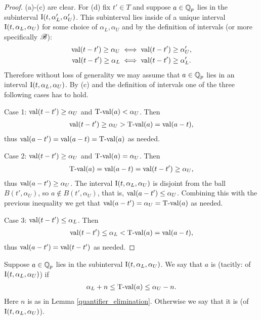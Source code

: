 \documentclass{amsart}
\begin{document}
\begin{proof}
  (a)-(c) are clear.
  For (d) fix $t' \in T$ and suppose $a \in \mathbb{Q}_p$ lies in the subinterval $\operatorname{I}(t, \alpha_L', \alpha_U')$.
  This  subinterval lies inside of a unique interval $\operatorname{I}(t, \alpha_L, \alpha_U)$ for some choice of $\alpha_L, \alpha_U$ and
  by the definition of intervals (or more specifically $\mathscr B$):
  \begin{align*}
    \operatorname{val}(t - t') \geq \alpha_U &\iff \operatorname{val}(t - t') \geq \alpha_U',\\
    \operatorname{val}(t - t') \geq \alpha_L &\iff \operatorname{val}(t - t') \geq \alpha_L'.
  \end{align*}
  Therefore without loss of generality we may assume that $a \in \mathbb{Q}_p$ lies in an interval $\operatorname{I}(t, \alpha_L, \alpha_U)$.
  By (c) and the definition of intervals one of the three following cases has to hold.
  
  Case 1: $\operatorname{val}(t - t') \geq \alpha_U$ and $\operatorname{T-val}(a) < \alpha_U$. Then
  \begin{align*}
    \operatorname{val}(t - t') \geq \alpha_U > \operatorname{T-val}(a) = \operatorname{val}(a - t),
  \end{align*}
  thus $\operatorname{val}(a - t') = \operatorname{val}(a - t) = \operatorname{T-val}(a)$ as needed.

  Case 2: $\operatorname{val}(t - t') \geq \alpha_U$ and $\operatorname{T-val}(a) = \alpha_U$. Then
  \begin{align*}
    \operatorname{T-val}(a) = \operatorname{val}(a - t) = \operatorname{val}(t - t') \geq \alpha_U,
  \end{align*}
  thus $\operatorname{val}(a - t') \geq \alpha_U$.
  The interval $\operatorname{I}(t, \alpha_L, \alpha_U)$ is disjoint from the ball $B(t', \alpha_U)$,
  so $a \notin B(t', \alpha_U)$, that is, $\operatorname{val}(a - t') \leq \alpha_U$.
  Combining this with the previous inequality we get that $\operatorname{val}(a - t') = \alpha_U = \operatorname{T-val}(a)$ as needed.

  Case 3: $\operatorname{val}(t - t') \leq \alpha_L$. Then
  \begin{align*}
    \operatorname{val}(t - t') \leq \alpha_L < \operatorname{T-val}(a) = \operatorname{val}(a - t),
  \end{align*}
  thus $\operatorname{val}(a - t') = \operatorname{val}(t - t')$ as needed. 
\end{proof}




\begin{Definition}
  Suppose $a \in \mathbb{Q}_p$ lies in the subinterval $\operatorname{I}(t, \alpha_L, \alpha_U)$.
  We say that $a$ is  (tacitly: of $\operatorname{I}(t, \alpha_L, \alpha_U)$) if 
    \begin{align*}
	\alpha_L + n \leq \operatorname{T-val}(a) \leq \alpha_U - n.
    \end{align*}
  Here $n$ is as in Lemma \ref{quantifier_elimination}.
  Otherwise we say that it is  (of $\operatorname{I}(t, \alpha_L, \alpha_U)$).
\end{Definition}
\end{document}
